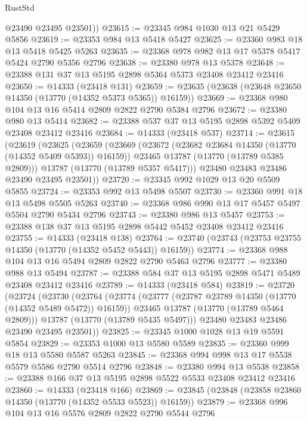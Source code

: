 \begin{lexlean}{RustStd}
\begin{coremodule}
        @23490
        @23495
        @23501))
@23615 := @23345 @984 @1030 @13 @21 @5429 @5856
@23619 := @23353 @984 @13 @5418 @5427
@23625 := @23360 @983 @18 @13 @5418 @5425 @5263
@23635 := @23368 @978 @982 @13 @17 @5378 @5417 @5424 @2790 @5356 @2796
@23638 := @23380 @978 @13 @5378
@23648 := @23388 @131 @37 @13 @5195 @2898 @5364 @5373 @23408 @23412 @23416
@23650 := @14333 (@23418 @131)
@23659 := @23635 (@23638 (@23648 @23650 @14350 (@13770 (@14352 @5373 @5365)) @16159))
@23669 := @23368 @980 @104 @13 @16 @5414 @2809 @2822 @2790 @5384 @2796
@23672 := @23380 @980 @13 @5414
@23682 := @23388 @537 @37 @13 @5195 @2898 @5392 @5409 @23408 @23412 @23416
@23684 := @14333 (@23418 @537)
@23714 := @23615
    (@23619
      (@23625
        (@23659
          (@23669
            (@23672 (@23682 @23684 @14350 (@13770 (@14352 @5409 @5393)) @16159))
            @23465
            @13787
            (@13770 (@13789 @5385 @2809)))
          @13787
          (@13770 (@13789 @5357 @5417)))
        @23480
        @23483
        @23486
        @23490
        @23495
        @23501))
@23720 := @23345 @992 @1029 @13 @20 @5509 @5855
@23724 := @23353 @992 @13 @5498 @5507
@23730 := @23360 @991 @18 @13 @5498 @5505 @5263
@23740 := @23368 @986 @990 @13 @17 @5457 @5497 @5504 @2790 @5434 @2796
@23743 := @23380 @986 @13 @5457
@23753 := @23388 @138 @37 @13 @5195 @2898 @5442 @5452 @23408 @23412 @23416
@23755 := @14333 (@23418 @138)
@23764 := @23740 (@23743 (@23753 @23755 @14350 (@13770 (@14352 @5452 @5443)) @16159))
@23774 := @23368 @988 @104 @13 @16 @5494 @2809 @2822 @2790 @5463 @2796
@23777 := @23380 @988 @13 @5494
@23787 := @23388 @584 @37 @13 @5195 @2898 @5471 @5489 @23408 @23412 @23416
@23789 := @14333 (@23418 @584)
@23819 := @23720
    (@23724
      (@23730
        (@23764
          (@23774
            (@23777 (@23787 @23789 @14350 (@13770 (@14352 @5489 @5472)) @16159))
            @23465
            @13787
            (@13770 (@13789 @5464 @2809)))
          @13787
          (@13770 (@13789 @5435 @5497)))
        @23480
        @23483
        @23486
        @23490
        @23495
        @23501))
@23825 := @23345 @1000 @1028 @13 @19 @5591 @5854
@23829 := @23353 @1000 @13 @5580 @5589
@23835 := @23360 @999 @18 @13 @5580 @5587 @5263
@23845 := @23368 @994 @998 @13 @17 @5538 @5579 @5586 @2790 @5514 @2796
@23848 := @23380 @994 @13 @5538
@23858 := @23388 @166 @37 @13 @5195 @2898 @5522 @5533 @23408 @23412 @23416
@23860 := @14333 (@23418 @166)
@23869 := @23845 (@23848 (@23858 @23860 @14350 (@13770 (@14352 @5533 @5523)) @16159))
@23879 := @23368 @996 @104 @13 @16 @5576 @2809 @2822 @2790 @5544 @2796

\end{coremodule}
\end{lexlean}

